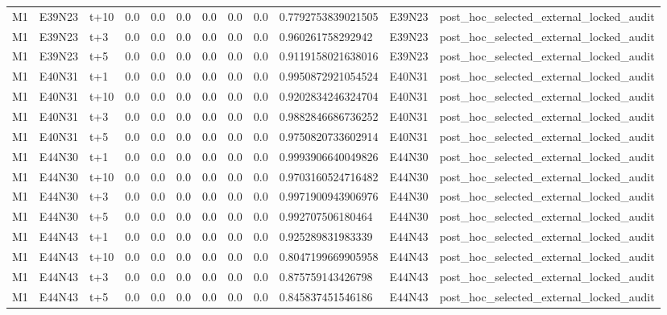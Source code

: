 \begin{landscape}
\begin{longtable}{llllllllllll}
M1 & E39N23 & t+10 & 0.0 & 0.0 & 0.0 & 0.0 & 0.0 & 0.0 & 0.7792753839021505 & E39N23 & post\_hoc\_selected\_external\_locked\_audit \\
M1 & E39N23 & t+3 & 0.0 & 0.0 & 0.0 & 0.0 & 0.0 & 0.0 & 0.960261758292942 & E39N23 & post\_hoc\_selected\_external\_locked\_audit \\
M1 & E39N23 & t+5 & 0.0 & 0.0 & 0.0 & 0.0 & 0.0 & 0.0 & 0.9119158021638016 & E39N23 & post\_hoc\_selected\_external\_locked\_audit \\
M1 & E40N31 & t+1 & 0.0 & 0.0 & 0.0 & 0.0 & 0.0 & 0.0 & 0.9950872921054524 & E40N31 & post\_hoc\_selected\_external\_locked\_audit \\
M1 & E40N31 & t+10 & 0.0 & 0.0 & 0.0 & 0.0 & 0.0 & 0.0 & 0.9202834246324704 & E40N31 & post\_hoc\_selected\_external\_locked\_audit \\
M1 & E40N31 & t+3 & 0.0 & 0.0 & 0.0 & 0.0 & 0.0 & 0.0 & 0.9882846686736252 & E40N31 & post\_hoc\_selected\_external\_locked\_audit \\
M1 & E40N31 & t+5 & 0.0 & 0.0 & 0.0 & 0.0 & 0.0 & 0.0 & 0.9750820733602914 & E40N31 & post\_hoc\_selected\_external\_locked\_audit \\
M1 & E44N30 & t+1 & 0.0 & 0.0 & 0.0 & 0.0 & 0.0 & 0.0 & 0.9993906640049826 & E44N30 & post\_hoc\_selected\_external\_locked\_audit \\
M1 & E44N30 & t+10 & 0.0 & 0.0 & 0.0 & 0.0 & 0.0 & 0.0 & 0.9703160524716482 & E44N30 & post\_hoc\_selected\_external\_locked\_audit \\
M1 & E44N30 & t+3 & 0.0 & 0.0 & 0.0 & 0.0 & 0.0 & 0.0 & 0.9971900943906976 & E44N30 & post\_hoc\_selected\_external\_locked\_audit \\
M1 & E44N30 & t+5 & 0.0 & 0.0 & 0.0 & 0.0 & 0.0 & 0.0 & 0.992707506180464 & E44N30 & post\_hoc\_selected\_external\_locked\_audit \\
M1 & E44N43 & t+1 & 0.0 & 0.0 & 0.0 & 0.0 & 0.0 & 0.0 & 0.925289831983339 & E44N43 & post\_hoc\_selected\_external\_locked\_audit \\
M1 & E44N43 & t+10 & 0.0 & 0.0 & 0.0 & 0.0 & 0.0 & 0.0 & 0.8047199669905958 & E44N43 & post\_hoc\_selected\_external\_locked\_audit \\
M1 & E44N43 & t+3 & 0.0 & 0.0 & 0.0 & 0.0 & 0.0 & 0.0 & 0.875759143426798 & E44N43 & post\_hoc\_selected\_external\_locked\_audit \\
M1 & E44N43 & t+5 & 0.0 & 0.0 & 0.0 & 0.0 & 0.0 & 0.0 & 0.845837451546186 & E44N43 & post\_hoc\_selected\_external\_locked\_audit \\

\end{longtable}
\end{landscape}
